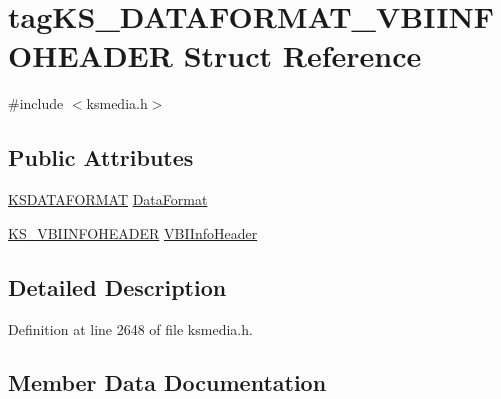 \hypertarget{structtag_k_s___d_a_t_a_f_o_r_m_a_t___v_b_i_i_n_f_o_h_e_a_d_e_r}{}\section{tag\+K\+S\+\_\+\+D\+A\+T\+A\+F\+O\+R\+M\+A\+T\+\_\+\+V\+B\+I\+I\+N\+F\+O\+H\+E\+A\+D\+ER Struct Reference}
\label{structtag_k_s___d_a_t_a_f_o_r_m_a_t___v_b_i_i_n_f_o_h_e_a_d_e_r}


{\ttfamily \#include $<$ksmedia.\+h$>$}

\subsection*{Public Attributes}
\begin{DoxyCompactItemize}
\item 
\hyperlink{union_k_s_d_a_t_a_f_o_r_m_a_t}{K\+S\+D\+A\+T\+A\+F\+O\+R\+M\+AT} \hyperlink{structtag_k_s___d_a_t_a_f_o_r_m_a_t___v_b_i_i_n_f_o_h_e_a_d_e_r_aea0c680dd4bc78a8ebeac530863fd2a7}{Data\+Format}
\item 
\hyperlink{ksmedia_8h_a8d02c7af80e7864a38e331c8c42d6fa2}{K\+S\+\_\+\+V\+B\+I\+I\+N\+F\+O\+H\+E\+A\+D\+ER} \hyperlink{structtag_k_s___d_a_t_a_f_o_r_m_a_t___v_b_i_i_n_f_o_h_e_a_d_e_r_a27ce4450a0307d1418dace64d39abbe5}{V\+B\+I\+Info\+Header}
\end{DoxyCompactItemize}


\subsection{Detailed Description}


Definition at line 2648 of file ksmedia.\+h.



\subsection{Member Data Documentation}
